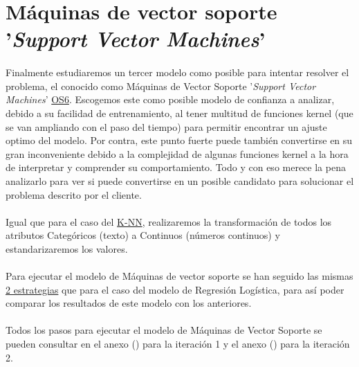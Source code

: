 \section{Máquinas de vector soporte '\textit{Support Vector Machines}'}
\label{section:svm}

\paragraph{}
Finalmente estudiaremos un tercer modelo como posible para intentar resolver el problema, el conocido como Máquinas de Vector Soporte '\textit{Support Vector Machines}'\cite{ref:svm_def} \hyperref[os:OS6]{OS6}. Escogemos este como posible modelo de confianza a analizar, debido a su facilidad de entrenamiento, al tener multitud de funciones kernel\cite{ref:svm_kernels_def} (que se van ampliando\cite{ref:svm_kernels_publication} con el paso del tiempo) para permitir encontrar un ajuste optimo del modelo. Por contra, este punto fuerte puede también convertirse en su gran inconveniente debido a la complejidad de algunas funciones kernel a la hora de interpretar y comprender su comportamiento. Todo y con eso merece la pena analizarlo para ver si puede convertirse en un posible candidato para solucionar el problema descrito por el cliente.

\paragraph{}
Igual que para el caso del \hyperref[section:knn]{K-NN}, realizaremos la transformación de todos los atributos Categóricos (texto) a Continuos (números continuos) y estandarizaremos los valores.

\paragraph{}
Para ejecutar el modelo de Máquinas de vector soporte se han seguido las mismas \hyperref[section:lr_casos]{2 estrategias} que para el caso del modelo de Regresión Logística, para así poder comparar los resultados de este modelo con los anteriores.

\paragraph{}
Todos los pasos para ejecutar el modelo de Máquinas de Vector Soporte se pueden consultar en el anexo () para la iteración 1 y el anexo () para la iteración 2.

